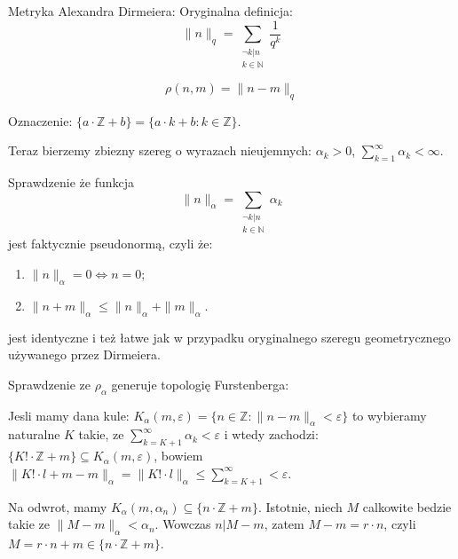 \documentclass[12pt]{amsart}
\begin{document}
Metryka Alexandra Dirmeiera:
Oryginalna definicja: 
\[ \| n \|_q = \sum_{\substack{\neg k | n \\ k \in \mathbb{N}}} \frac{1}{q^k} \]

\[\rho(n,m) = \| n - m \|_q\]

Oznaczenie:
$\{a \cdot \mathbb{Z} + b\} = \{ a \cdot k + b: k \in \mathbb{Z}\}$.

Teraz bierzemy zbiezny szereg o wyrazach nieujemnych:
$\alpha_k > 0$, $\sum_{k = 1}^\infty \alpha_k < \infty$.

Sprawdzenie że funkcja 
\[
\| n \|_\alpha = \sum_{\substack{\neg k | n \\ k \in \mathbb{N}}} \alpha_k 
\]  
jest faktycznie pseudonormą, czyli że:
\begin{enumerate}
\item
  $\| n \|_\alpha = 0 \iff n = 0;$
\item
  $\|n + m\|_\alpha \leq \| n \|_\alpha + \| m \|_\alpha$. 
\end{enumerate}
jest identyczne i też łatwe jak w przypadku oryginalnego
szeregu geometrycznego używanego przez Dirmeiera.

Sprawdzenie ze $\rho_\alpha$ generuje topologię Furstenberga:

Jesli mamy dana kule: 
$K_\alpha(m,\varepsilon) = \{ n \in \mathbb{Z}: \| n - m\|_\alpha < \varepsilon\}$
to wybieramy naturalne $K$ takie, ze
$\sum_{k = K + 1}^\infty \alpha_k < \varepsilon$ i wtedy zachodzi:
  $\{ K! \cdot \mathbb{Z} + m\} \subseteq K_\alpha(m,\varepsilon)$, 
bowiem 
  $\| K! \cdot l + m - m \|_\alpha = \| K! \cdot l \|_\alpha \leq \sum_{k = K + 1}^\infty < \varepsilon$.
  
Na odwrot, mamy 
$K_\alpha(m, \alpha_n) \subseteq \{n \cdot\mathbb{Z} + m\}$.
Istotnie, niech $M$ calkowite bedzie takie ze 
$\|M - m\|_\alpha < \alpha_n$. Wowczas
$n | M - m$, zatem $M - m = r\cdot n$, czyli $M = r\cdot n + m \in 
\{n \cdot\mathbb{Z} + m\}$. 
\end{document}
